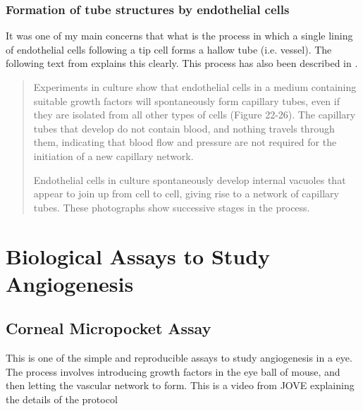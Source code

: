 \subsubsection*{Formation of tube structures by endothelial cells}
It was one of my main concerns that what is the process in which a single lining of endothelial cells following a tip cell forms a hallow tube (i.e. vessel). The following text from \cite{Alberts2002} explains this clearly. This process has also been described in \cite{angiogenesisYoutube}.
\begin{quote}
	Experiments in culture show that endothelial cells in a medium containing suitable growth factors will spontaneously form capillary tubes, even if they are isolated from all other types of cells (Figure 22-26). The capillary tubes that develop do not contain blood, and nothing travels through them, indicating that blood flow and pressure are not required for the initiation of a new capillary network.
	
	Endothelial cells in culture spontaneously develop internal vacuoles that appear to join up from cell to cell, giving rise to a network of capillary tubes. These photographs show successive stages in the process. 
\end{quote}






\section{Biological Assays to Study Angiogenesis}

\subsection{Corneal Micropocket Assay}
This is one of the simple and reproducible assays to study angiogenesis in a eye. The process involves introducing growth factors in the eye ball of mouse, and then letting the vascular network to form. This is a video from JOVE explaining the details of the protocol \citep{conealMicroPocketAssayJOVE} 